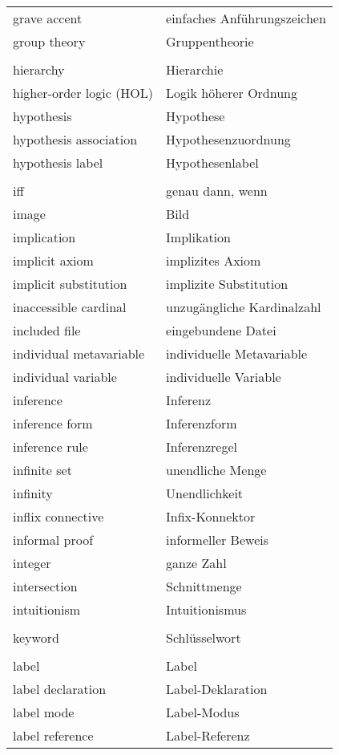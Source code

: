 \begin{longtabu}   { @{} X[l] X[l] }
    grave accent & einfaches Anführungszeichen \\
    group theory & Gruppentheorie \\
     & \\
    hierarchy & Hierarchie \\
    higher-order logic (HOL) & Logik höherer Ordnung \\
    hypothesis & Hypothese \\
    hypothesis association & Hypothesenzuordnung \\
    hypothesis label & Hypothesenlabel \\
     & \\
    iff & genau dann, wenn \\
    image & Bild \\
    implication & Implikation \\
    implicit axiom & implizites Axiom \\
    implicit substitution & implizite Substitution \\
    inaccessible cardinal & unzugängliche Kardinalzahl \\
    included file & eingebundene Datei \\
    individual metavariable & individuelle Metavariable \\
    individual variable & individuelle Variable \\
    inference & Inferenz \\
    inference form & Inferenzform \\
    inference rule & Inferenzregel \\
    infinite set & unendliche Menge \\
    infinity & Unendlichkeit \\
    inflix connective & Infix-Konnektor \\
    informal proof & informeller Beweis \\
    integer & ganze Zahl \\
    intersection & Schnittmenge \\
    intuitionism & Intuitionismus \\
     & \\
    keyword & Schlüsselwort \\
     & \\
    label & Label \\
    label declaration & Label-Deklaration \\
    label mode & Label-Modus \\
    label reference & Label-Referenz \\

\end{longtabu}
